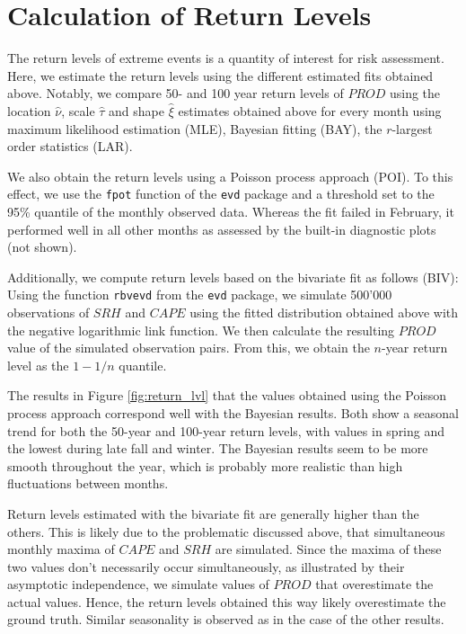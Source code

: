 \documentclass[10pt,conference,compsocconf]{IEEEtran}
\begin{document}
\section*{Calculation of Return Levels}
The return levels of extreme events is a quantity of interest for risk assessment. Here, we estimate the return levels using the different estimated fits obtained above. Notably, we compare 50- and 100 year return levels of $PROD$ using the location $\hat{\nu}$, scale $\hat{\tau}$ and shape $\hat{\xi}$ estimates obtained above for every month using maximum likelihood estimation (MLE), Bayesian fitting (BAY), the $r$-largest order statistics (LAR). 
\par
We also obtain the return levels using a Poisson process approach (POI). To this effect, we use the \texttt{fpot} function of the \texttt{evd} package and a threshold set to the 95\% quantile of the monthly observed data. Whereas the fit failed in February, it performed well in all other months as assessed by the built-in diagnostic plots (not shown). %
\par
Additionally, we compute return levels based on the bivariate fit as follows (BIV): Using the function \texttt{rbvevd} from the \texttt{evd} package, we simulate 500'000 observations of $SRH$ and $CAPE$ using the fitted distribution obtained above with the negative logarithmic link function. We then calculate the resulting $PROD$ value of the simulated observation pairs. From this, we obtain the $n$-year return level as the $1-1/n$ quantile. 
\par
The results in Figure \ref{fig:return_lvl} that the values obtained using the Poisson process approach correspond well with the Bayesian results. Both show a seasonal trend for both the 50-year and 100-year return levels, with values in spring and the lowest during late fall and winter. The Bayesian results seem to be more smooth throughout the year, which is probably more realistic than high fluctuations between months. 
\par
Return levels estimated with the bivariate fit are generally higher than the others. This is likely due to the problematic discussed above, that simultaneous monthly maxima of $CAPE$ and $SRH$ are simulated. Since the maxima of these two values don't necessarily occur simultaneously, as illustrated by their asymptotic independence, we simulate values of $PROD$ that overestimate the actual values. Hence, the return levels obtained this way likely overestimate the ground truth. Similar seasonality is observed as in the case of the other results. 
\end{document}
